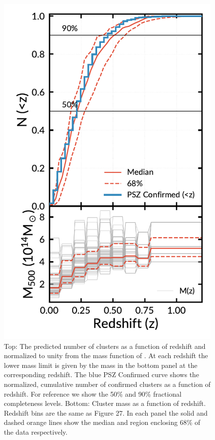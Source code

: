 \documentclass[apj, revtex4-1]{emulateapj}
\begin{document}
\begin{figure}
	\includegraphics[width=\columnwidth]{figures/cluster_forecast.pdf}
	\caption{Top: The predicted number of clusters as a function of redshift and normalized to unity from the mass function of \cite{Tinker2008}. At each redshift the lower mass limit is given by the mass in the bottom panel at the corresponding redshift. The blue PSZ Confirmed curve shows the normalized, cumulative number of confirmed clusters as a function of redshift. For reference we show the 50\% and 90\% fractional completeness levels. Bottom: Cluster mass as a function of redshift. Redshift bins are the same as \cite{PlanckCollaboration2015a} Figure 27. In each panel the solid and dashed orange lines show the median and region enclosing 68\% of the data respectively.}
	\label{fig:cluster_forecast}
\end{figure}
\end{document}
